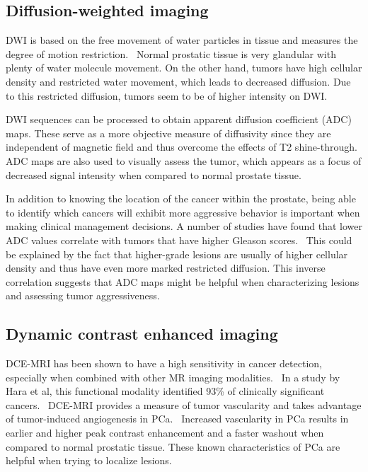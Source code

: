 \subsection{Diffusion-weighted imaging}
DWI is based on the free movement of water particles in tissue and measures the
degree of motion restriction.~\cite{Koh2007} Normal prostatic tissue is very glandular with
plenty of water molecule movement. On the other hand, tumors have high cellular
density and restricted water movement, which leads to decreased diffusion. Due
to this restricted diffusion, tumors seem to be of higher intensity on
DWI.~\cite{Koh2007}

DWI sequences can be processed to obtain apparent diffusion coefficient (ADC)
maps. These serve as a more objective measure of diffusivity since they are
independent of magnetic field and thus overcome the effects of T2
shine-through.~\cite{Turkbey2012,Koh2007}  ADC maps are also used to visually
assess the tumor, which appears as a focus of decreased signal intensity when
compared to normal prostate tissue.~\cite{Tan2011}

In addition to knowing the location of the cancer within the prostate, being
able to identify which cancers will exhibit more aggressive behavior is
important when making clinical management decisions. A number of studies have
found that lower ADC values correlate with tumors that have higher Gleason
scores.~\cite{Kobus2012,Woodfield2010,Hambrock2011} This could be explained by
the fact that higher-grade lesions are usually of higher cellular density and
thus have even more marked restricted diffusion. This inverse correlation
suggests that ADC maps might be helpful when characterizing lesions and
assessing tumor aggressiveness.~\cite{Vargas2011}

\subsection{Dynamic contrast enhanced imaging}
DCE-MRI has been shown to have a high sensitivity in cancer detection,
especially when combined with other MR imaging
modalities.~\cite{Tanimoto2007,Girouin2007,Ocak2007,Kim2005} In a study by Hara
et al, this functional modality identified 93\% of clinically significant
cancers.~\cite{Hara2005} DCE-MRI provides a measure of tumor vascularity and
takes advantage of tumor-induced angiogenesis in PCa.~\cite{Noworolski2005}
Increased vascularity in PCa results in earlier and higher peak contrast
enhancement and a faster washout when compared to normal prostatic tissue.
These known characteristics of PCa are helpful when trying to localize lesions. 


